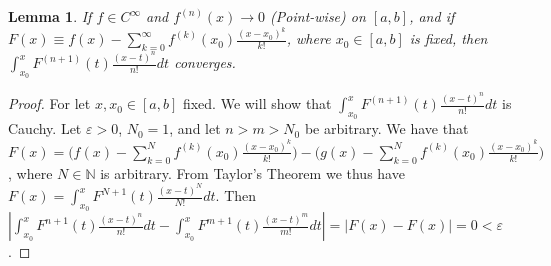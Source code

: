 \documentclass[oneside]{book}
\theoremstyle{mystyle}
\newtheorem{lemma}{Lemma}[section]
\begin{document}
\begin{lemma}
If $f\in C^{\infty}$ and $f^{(n)}(x)\rightarrow 0$ (Point-wise) on $[a,b]$, and if $F(x) \equiv f(x)-\sum_{k=0}^{\infty} f^{(k)}(x_0)\frac{(x-x_0)^{k}}{k!}$, where $x_0\in [a,b]$ is fixed, then $\int_{x_0}^{x} F^{(n+1)}(t)\frac{(x-t)^{n}}{n!}dt$ converges. 
\end{lemma}
\begin{proof}
For let $x,x_0\in [a,b]$ fixed. We will show that $\int_{x_0}^{x} F^{(n+1)}(t)\frac{(x-t)^{n}}{n!}dt$ is Cauchy. Let $\varepsilon>0$, $N_0 = 1$, and let $n>m>N_0$ be arbitrary. We have that $F(x) = \bigg(f(x)-\sum_{k=0}^{N} f^{(k)}(x_0)\frac{(x-x_0)^{k}}{k!}\bigg)-\bigg(g(x)-\sum_{k=0}^{N} f^{(k)}(x_0)\frac{(x-x_0)^{k}}{k!}\bigg)$, where $N\in \mathbb{N}$ is arbitrary. From Taylor's Theorem we thus have $F(x) = \int_{x_0}^{x}F^{N+1}(t)\frac{(x-t)^N}{N!}dt$. Then $|\int_{x_0}^{x}F^{n+1}(t)\frac{(x-t)^n}{n!}dt-\int_{x_0}^{x}F^{m+1}(t)\frac{(x-t)^m}{m!}dt| = |F(x)-F(x)|= 0 <\varepsilon$. 
\end{proof}
\end{document}
